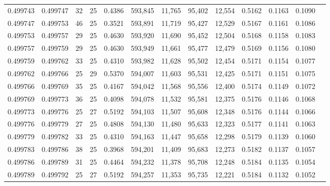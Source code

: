 \begin{tabular}{rrrrrrrrrrrrr}
0.499743 & 0.499747 &    32 &  25 &                                     0.4386 & 593,845 &  11,765 &  95,402 &  12,554 & 0.5162 & 0.1163 & 0.1090 \\
0.499747 & 0.499753 &    46 &  25 &                                     0.3521 & 593,891 &  11,719 &  95,427 &  12,529 & 0.5167 & 0.1161 & 0.1086 \\
0.499753 & 0.499757 &    29 &  25 &                                     0.4630 & 593,920 &  11,690 &  95,452 &  12,504 & 0.5168 & 0.1158 & 0.1083 \\
0.499757 & 0.499759 &    29 &  25 &                                     0.4630 & 593,949 &  11,661 &  95,477 &  12,479 & 0.5169 & 0.1156 & 0.1080 \\
0.499759 & 0.499762 &    33 &  25 &                                     0.4310 & 593,982 &  11,628 &  95,502 &  12,454 & 0.5171 & 0.1154 & 0.1077 \\
0.499762 & 0.499766 &    25 &  29 &                                     0.5370 & 594,007 &  11,603 &  95,531 &  12,425 & 0.5171 & 0.1151 & 0.1075 \\
0.499766 & 0.499769 &    35 &  25 &                                     0.4167 & 594,042 &  11,568 &  95,556 &  12,400 & 0.5174 & 0.1149 & 0.1072 \\
0.499769 & 0.499773 &    36 &  25 &                                     0.4098 & 594,078 &  11,532 &  95,581 &  12,375 & 0.5176 & 0.1146 & 0.1068 \\
0.499773 & 0.499776 &    25 &  27 &                                     0.5192 & 594,103 &  11,507 &  95,608 &  12,348 & 0.5176 & 0.1144 & 0.1066 \\
0.499776 & 0.499779 &    27 &  25 &                                     0.4808 & 594,130 &  11,480 &  95,633 &  12,323 & 0.5177 & 0.1141 & 0.1063 \\
0.499779 & 0.499782 &    33 &  25 &                                     0.4310 & 594,163 &  11,447 &  95,658 &  12,298 & 0.5179 & 0.1139 & 0.1060 \\
0.499783 & 0.499786 &    38 &  25 &                                     0.3968 & 594,201 &  11,409 &  95,683 &  12,273 & 0.5182 & 0.1137 & 0.1057 \\
0.499786 & 0.499789 &    31 &  25 &                                     0.4464 & 594,232 &  11,378 &  95,708 &  12,248 & 0.5184 & 0.1135 & 0.1054 \\
0.499789 & 0.499792 &    25 &  27 &                                     0.5192 & 594,257 &  11,353 &  95,735 &  12,221 & 0.5184 & 0.1132 & 0.1052 \\

\end{tabular}

